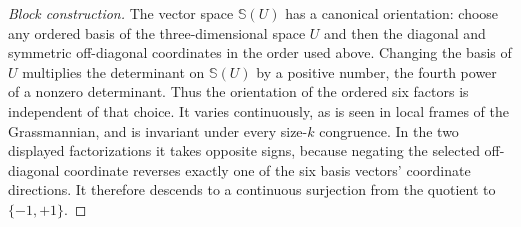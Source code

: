 \documentclass[11pt]{article}
\begin{document}
\begin{proof}[Block construction]
The vector space $\mathbb S(U)$ has a canonical orientation: choose any ordered basis of the three-dimensional space $U$ and then the diagonal and symmetric off-diagonal coordinates in the order used above. Changing the basis of $U$ multiplies the determinant on $\mathbb S(U)$ by a positive number, the fourth power of a nonzero determinant. Thus the orientation of the ordered six factors is independent of that choice. It varies continuously, as is seen in local frames of the Grassmannian, and is invariant under every size-$k$ congruence. In the two displayed factorizations it takes opposite signs, because negating the selected off-diagonal coordinate reverses exactly one of the six basis vectors' coordinate directions. It therefore descends to a continuous surjection from the quotient to $\{-1,+1\}$.
\end{proof}
\end{document}
